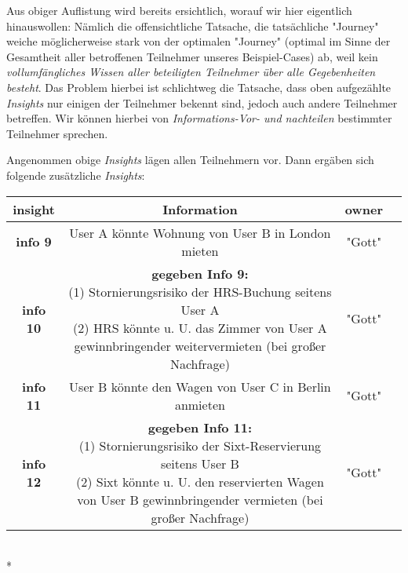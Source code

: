 \begin{Example}
\vspace{0.3cm}

Aus obiger Auflistung wird bereits ersichtlich, worauf wir hier eigentlich hinauswollen: Nämlich die offensichtliche Tatsache, die tatsächliche "Journey" weiche möglicherweise stark von der optimalen "Journey" (optimal im Sinne der Gesamtheit aller betroffenen Teilnehmer unseres Beispiel-Cases) ab, weil kein \textit{vollumfängliches Wissen aller beteiligten Teilnehmer über alle Gegebenheiten besteht}. Das Problem hierbei ist schlichtweg die Tatsache, dass oben aufgezählte \textit{Insights} nur einigen der Teilnehmer bekennt sind, jedoch auch andere Teilnehmer betreffen. Wir können hierbei von \textit{Informations-Vor- und nachteilen} bestimmter Teilnehmer sprechen.

\vspace{0.2cm}

Angenommen obige \textit{Insights} lägen allen Teilnehmern vor. Dann ergäben sich folgende zusätzliche \textit{Insights}:

\vspace{0.2cm}

\begin{tabular}[h]{|c|c|c|c}
\hline
\textbf{insight} & \textbf{Information} & \textbf{owner} \\
\hline
\textbf{info 9} & User A könnte Wohnung von User B in London mieten & "Gott" \\
\hline
\textbf{info 10} & \parbox{10cm}{\textbf{gegeben Info 9:} \\ (1) Stornierungsrisiko der HRS-Buchung seitens User A  \\ (2) HRS könnte u. U. das Zimmer von User A gewinnbringender weitervermieten (bei großer Nachfrage)} & "Gott" \\
\hline
\textbf{info 11} & User B könnte den Wagen von User C in Berlin anmieten & "Gott" \\
\hline
\textbf{info 12} & \parbox{10cm}{\textbf{gegeben Info 11:} \\ (1) Stornierungsrisiko der Sixt-Reservierung seitens User B  \\ (2) Sixt könnte u. U. den reservierten Wagen von User B gewinnbringender vermieten (bei großer Nachfrage)} & "Gott" \\
\hline
\end{tabular}\vspace*{0.3cm}\\*

\vspace{0.2cm}


\end{Example}
